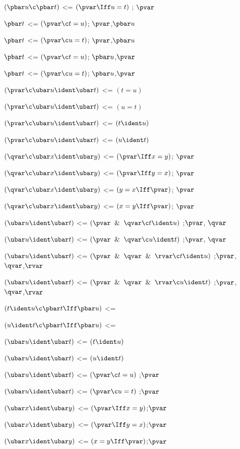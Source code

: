 $(\pbar u \c \pbar t)$ <= $(\pvar \Iff u = t)$ ; $\pvar$

$\pbar t$ <= $(\pvar \c t = u)$; $\pvar$,$\pbar u$

$\pbar t$ <= $(\pvar \c u = t)$; $\pvar$,$\pbar u$

$\pbar t$ <= $(\pvar \c t = u)$; $\pbar u$,$\pvar$

$\pbar t$ <= $(\pvar \c u = t)$; $\pbar u$,$\pvar$

$(\pvar \c \ubar u \ident \ubar t)$ <= $(t = u)$ 

$(\pvar \c \ubar u \ident \ubar t)$ <= $(u =  t)$ 

$(\pvar \c \ubar u \ident \ubar t)$ <= $(t \ident u)$ 

$(\pvar \c \ubar u \ident \ubar t)$ <= $(u \ident t)$ 

$(\qvar \c \ubar x \ident \ubar y)$ <= $(\pvar \Iff x = y)$; $\pvar$

$(\qvar \c \ubar x \ident \ubar y)$ <= $(\pvar \Iff y = x)$; $\pvar$

$(\qvar \c \ubar x \ident \ubar y)$ <= $( y = x\Iff \pvar)$; $\pvar$

$(\qvar \c \ubar x \ident \ubar y)$ <= $( x = y\Iff \pvar)$; $\pvar$

$(\ubar u \ident \ubar t)$ <= $(\pvar \And \qvar \c t \ident u)$ ;$\pvar$, $\qvar$

$(\ubar u \ident \ubar t)$ <= $(\pvar \And \qvar \c u \ident t)$ ;$\pvar$, $\qvar$

$(\ubar u \ident \ubar t)$ <= $(\pvar \And \qvar\And \rvar \c t \ident u)$ ;$\pvar$, $\qvar$,$\rvar$

$(\ubar u \ident \ubar t)$ <= $(\pvar \And \qvar\And \rvar \c u \ident t)$ ;$\pvar$, $\qvar$,$\rvar$

$(t \ident u \c \pbar t \Iff \pbar u)$ <=

$(u \ident t \c \pbar t \Iff \pbar u)$ <=

$(\ubar u \ident \ubar t)$ <= $(t \ident u)$

$(\ubar u \ident \ubar t)$ <= $(u \ident t)$

$(\ubar u \ident \ubar t)$ <= $(\pvar \c t = u)$ ;$\pvar$

$(\ubar u \ident \ubar t)$ <= $(\pvar \c u = t)$ ;$\pvar$

$(\ubar x \ident \ubar y)$ <= $(\pvar \Iff x = y)$;$\pvar$

$(\ubar x \ident \ubar y)$ <= $(\pvar \Iff y = x)$;$\pvar$

$(\ubar x \ident \ubar y)$ <= $(x = y\Iff \pvar)$;$\pvar$

